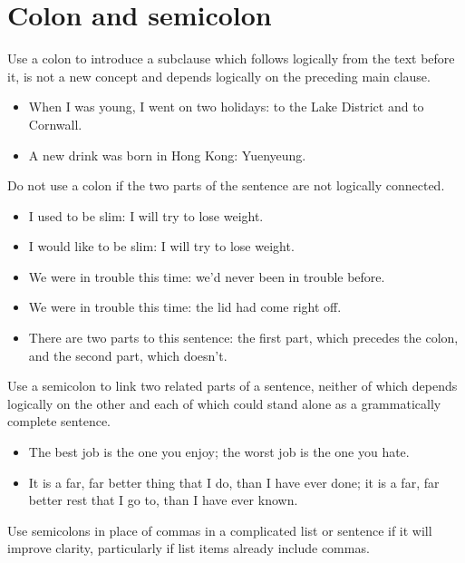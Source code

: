 \documentclass[11pt,a4paper]{book}
\newcommand{\xmark}{{\color{cadmiumred}\ding{54}}}%
\newcommand{\cmark}{{\color{green(html/cssgreen)}\checkmark}}%
\begin{document}
		\section{Colon and semicolon}
			Use a colon to introduce a subclause which follows logically from the text before it, is not a new concept and depends logically on the preceding main clause.
			{\firasans \begin{mdframed}[backgroundcolor=aliceblue] \begin{itemize}[label=\cmark]
				\item When I was young, I went on two holidays: to the Lake District and to Cornwall.
				\item A new drink was born in Hong Kong: Yuenyeung.
			\end{itemize} \end{mdframed} }
			Do not use a colon if the two parts of the sentence are not logically connected.
			{\firasans \begin{mdframed}[backgroundcolor=aliceblue] \begin{itemize}[label=\cmark]
				\item[\xmark] I used to be slim: I will try to lose weight.
				\item I would like to be slim: I will try to lose weight.
				\item[\xmark] We were in trouble this time: we'd never been in trouble before.
				\item We were in trouble this time: the lid had come right off.
				\item There are two parts to this sentence: the first part, which precedes the colon, and the second part, which doesn't.
			\end{itemize} \end{mdframed} }
			Use a semicolon to link two related parts of a sentence, neither of which depends logically on the other and each of which could stand alone as a grammatically complete sentence.
			{\firasans \begin{mdframed}[backgroundcolor=aliceblue] \begin{itemize}[label=\cmark]
				\item The best job is the one you enjoy; the worst job is the one you hate.
				\item It is a far, far better thing that I do, than I have ever done; it is a far, far better rest that I go to, than I have ever known.
			\end{itemize} \end{mdframed} }
			Use semicolons in place of commas in a complicated list or sentence if it will improve clarity, particularly if list items already include commas.
\end{document}
